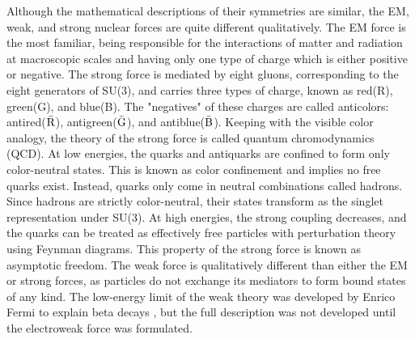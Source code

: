 \indent Although the mathematical descriptions of their symmetries are similar, the EM, weak, and strong nuclear forces are quite different qualitatively. The EM force is the most familiar, being responsible for the interactions of matter and radiation at macroscopic scales and having only one type of charge which is either positive or negative. The strong force is mediated by eight gluons, corresponding to the eight generators of SU(3), and carries three types of charge, known as red(R), green(G), and blue(B). The "negatives" of these charges are called anticolors: antired($\bar{\rm{R}}$), antigreen($\bar{\rm{G}}$), and antiblue($\bar{\rm{B}}$). Keeping with the visible color analogy, the theory of the strong force is called quantum chromodynamics (QCD). At low energies, the quarks and antiquarks are confined to form only color-neutral states. This is known as color confinement and implies no free quarks exist. Instead, quarks only come in neutral combinations called hadrons. Since hadrons are strictly color-neutral, their states transform as the singlet representation under SU(3). At high energies, the strong coupling decreases, and the quarks can be treated as effectively free particles with perturbation theory using Feynman diagrams. This property of the strong force is known as asymptotic freedom. The weak force is qualitatively different than either the EM or strong forces, as particles do not exchange its mediators to form bound states of any kind. The low-energy limit of the weak theory was developed by Enrico Fermi to explain beta decays \cite{Fermi:1933jpa}, but the full description was not developed until the electroweak force was formulated. 

